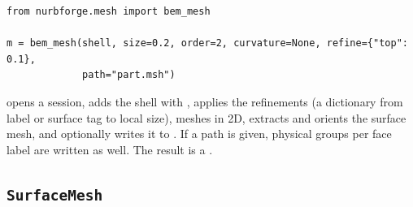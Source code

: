 \begin{lstlisting}[style=python]
from nurbforge.mesh import bem_mesh

m = bem_mesh(shell, size=0.2, order=2, curvature=None, refine={"top": 0.1},
             path="part.msh")
\end{lstlisting}

 opens a session, adds the shell with , applies the
refinements (a dictionary from label or surface tag to local size), meshes in 2D, extracts and
orients the surface mesh, and optionally writes it to . If a path is given, physical
groups per face label are written as well. The result is a .

\subsection{\texttt{SurfaceMesh}}

